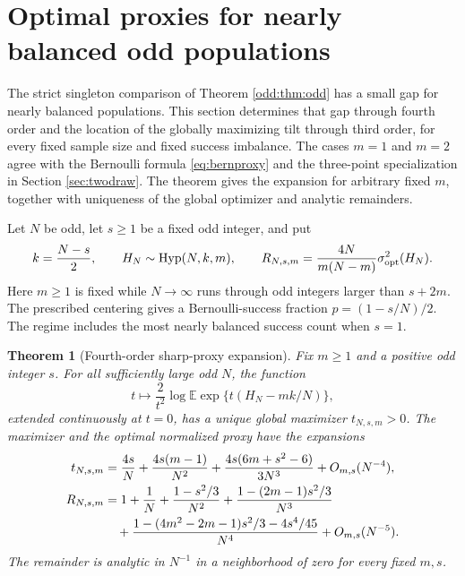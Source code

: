 \documentclass[11pt,a4paper]{article}
\newtheorem{theorem}{Theorem}[section]
\newcommand{\E}{\mathbb E}\newcommand{\R}{\mathbb R}\newcommand{\N}{\mathbb N}\newcommand{\one}{\mathbf1}
\begin{document}
\appendix

\section{Optimal proxies for nearly balanced odd populations}\label{sec:odd_asym}
The strict singleton comparison of Theorem \ref{odd:thm:odd} has a small gap for nearly balanced populations. This section determines that gap through fourth order and the location of the globally maximizing tilt through third order, for every fixed sample size and fixed success imbalance. The cases $m=1$ and $m=2$ agree with the Bernoulli formula \eqref{eq:bernproxy} and the three-point specialization in Section \ref{sec:twodraw}. The theorem gives the expansion for arbitrary fixed $m$, together with uniqueness of the global optimizer and analytic remainders.

Let $N$ be odd, let $s\ge1$ be a fixed odd integer, and put
\begin{equation}\label{eq:oddparams}
 k=\frac{N-s}{2},\qquad H_N\sim\operatorname{Hyp}(N,k,m),\qquad
 R_{N,s,m}=\frac{4N}{m(N-m)}\sigma^2_{\mathrm{opt}}(H_N).
\end{equation}
Here $m\ge1$ is fixed while $N\to\infty$ runs through odd integers larger than $s+2m$. The prescribed centering gives a Bernoulli-success fraction $p=(1-s/N)/2$. The regime includes the most nearly balanced success count when $s=1$.

\begin{theorem}[Fourth-order sharp-proxy expansion]\label{thm:odd_expansion}
Fix $m\ge1$ and a positive odd integer $s$. For all sufficiently large odd $N$, the function
\[
 t\longmapsto\frac{2}{t^2}\log\E\exp\{t(H_N-mk/N)\},
\]
extended continuously at $t=0$, has a unique global maximizer $t_{N,s,m}>0$. The maximizer and the optimal normalized proxy have the expansions
\begin{align}
 t_{N,s,m}&=\frac{4s}{N}+\frac{4s(m-1)}{N^2}
 +\frac{4s(6m+s^2-6)}{3N^3}+O_{m,s}(N^{-4}),\label{eq:tiltexp}\\
 R_{N,s,m}
 &=1+\frac1N+\frac{1-s^2/3}{N^2}
 +\frac{1-(2m-1)s^2/3}{N^3}\notag\\
 &\quad+\frac{1-(4m^2-2m-1)s^2/3-4s^4/45}{N^4}
 +O_{m,s}(N^{-5}).\label{eq:Rexp}
\end{align}
The remainder is analytic in $N^{-1}$ in a neighborhood of zero for every fixed $m,s$.
\end{theorem}
\end{document}

